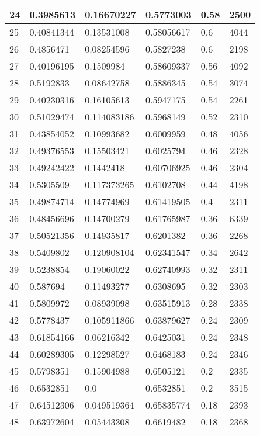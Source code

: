 \begin{longtable}{|l|l|l|l|l|l|}
24 & 0.3985613 & 0.16670227 & 0.5773003 & 0.58 & 2500 \\ \hline 
25 & 0.40841344 & 0.13531008 & 0.58056617 & 0.6 & 4044 \\ \hline 
26 & 0.4856471 & 0.08254596 & 0.5827238 & 0.6 & 2198 \\ \hline 
27 & 0.40196195 & 0.1509984 & 0.58609337 & 0.56 & 4092 \\ \hline 
28 & 0.5192833 & 0.08642758 & 0.5886345 & 0.54 & 3074 \\ \hline 
29 & 0.40230316 & 0.16105613 & 0.5947175 & 0.54 & 2261 \\ \hline 
30 & 0.51029474 & 0.114083186 & 0.5968149 & 0.52 & 2310 \\ \hline 
31 & 0.43854052 & 0.10993682 & 0.6009959 & 0.48 & 4056 \\ \hline 
32 & 0.49376553 & 0.15503421 & 0.6025794 & 0.46 & 2328 \\ \hline 
33 & 0.49242422 & 0.1442418 & 0.60706925 & 0.46 & 2304 \\ \hline 
34 & 0.5305509 & 0.117373265 & 0.6102708 & 0.44 & 4198 \\ \hline 
35 & 0.49874714 & 0.14774969 & 0.61419505 & 0.4 & 2311 \\ \hline 
36 & 0.48456696 & 0.14700279 & 0.61765987 & 0.36 & 6339 \\ \hline 
37 & 0.50521356 & 0.14935817 & 0.6201382 & 0.36 & 2268 \\ \hline 
38 & 0.5409802 & 0.120908104 & 0.62341547 & 0.34 & 2642 \\ \hline 
39 & 0.5238854 & 0.19060022 & 0.62740993 & 0.32 & 2311 \\ \hline 
40 & 0.587694 & 0.11493277 & 0.6308695 & 0.32 & 2303 \\ \hline 
41 & 0.5809972 & 0.08939098 & 0.63515913 & 0.28 & 2338 \\ \hline 
42 & 0.5778437 & 0.105911866 & 0.63879627 & 0.24 & 2309 \\ \hline 
43 & 0.61854166 & 0.06216342 & 0.6425031 & 0.24 & 2348 \\ \hline 
44 & 0.60289305 & 0.12298527 & 0.6468183 & 0.24 & 2346 \\ \hline 
45 & 0.5798351 & 0.15904988 & 0.6505121 & 0.2 & 2335 \\ \hline 
46 & 0.6532851 & 0.0 & 0.6532851 & 0.2 & 3515 \\ \hline 
47 & 0.64512306 & 0.049519364 & 0.65835774 & 0.18 & 2393 \\ \hline 
48 & 0.63972604 & 0.05443308 & 0.6619482 & 0.18 & 2368 \\ \hline 

\end{longtable}
